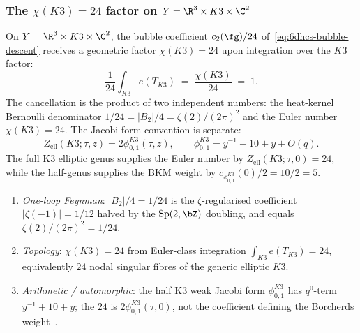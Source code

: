 \subsubsection{The $\chi(K3)=24$ factor on $Y=\R^3\times K3\times\C^2$}
\label{subsubsec:6dhcs-chi-K3}

\begin{proposition}
\label{prop:6dhcs-chi-K3-24}
On $Y=\R^3\times K3\times\C^2$, the bubble coefficient $c_2(\fg)/24$
of~\eqref{eq:6dhcs-bubble-descent} receives a geometric factor
$\chi(K3)=24$ upon integration over the $K3$ factor:
\begin{equation}\label{eq:6dhcs-K3-integration}
 \frac{1}{24}\int_{K3} e(T_{K3})
 \;=\;
 \frac{\chi(K3)}{24}
 \;=\; 1.
\end{equation}
The cancellation is the product of two independent numbers: the
heat-kernel Bernoulli denominator \(1/24=|B_2|/4=\zeta(2)/(2\pi)^2\)
and the Euler number \(\chi(K3)=24\). The Jacobi-form convention is separate:
\[
 Z_{\mathrm{ell}}(K3;\tau,z)=2\phi_{0,1}^{K3}(\tau,z),\qquad
 \phi_{0,1}^{K3}=y^{-1}+10+y+O(q).
\]
The full K3 elliptic genus supplies the Euler number by
\(Z_{\mathrm{ell}}(K3;\tau,0)=24\), while the half-genus supplies the
BKM weight by
\(c_{\phi_{0,1}^{K3}}(0)/2=10/2=5\).
\begin{enumerate}[label=\textup{(\roman*)}]
\item \emph{One-loop Feynman}: $|B_2|/4=1/24$ is the
 $\zeta$-regularised coefficient $|\zeta(-1)|=1/12$ halved by the
 $\mathrm{Sp}(2,\bZ)$ doubling, and equals
 $\zeta(2)/(2\pi)^2=1/24$.
\item \emph{Topology}: $\chi(K3)=24$ from Euler-class integration
 $\int_{K3}e(T_{K3})=24$, equivalently $24$ nodal singular fibres
 of the generic elliptic $K3$.
\item \emph{Arithmetic / automorphic}: the half K3 weak Jacobi form
 \(\phi_{0,1}^{K3}\) has \(q^0\)-term \(y^{-1}+10+y\); the \(24\) is
 \(2\phi_{0,1}^{K3}(\tau,0)\), not the coefficient defining the
 Borcherds weight~\cite{EguchiOoguriTachikawa2011}.
\end{enumerate}
\end{proposition}

